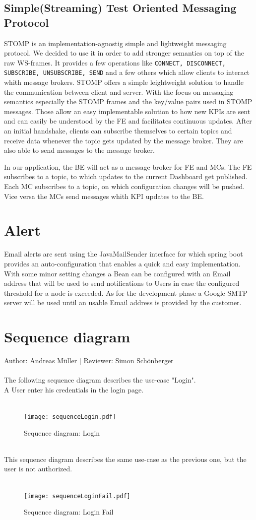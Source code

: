 \documentclass{scrreprt}
\begin{document}
\subsection{Simple(Streaming) Test Oriented Messaging Protocol}
STOMP is an implementation-agnostig simple and lightweight messaging protocol. We decided
to use it in order to add stronger semantics on top of the raw WS-frames. It provides a few
operations like \texttt{CONNECT, DISCONNECT, SUBSCRIBE, UNSUBSCRIBE, SEND} and a few others
which allow clients to interact whith message brokers.
STOMP offers a simple leightweight solution to handle the communication between client and server. With the focus on messaging semantics especially the STOMP frames and the key/value pairs used in STOMP messages. Those allow an easy implementable solution to how new KPIs are sent and can easily be understood by the FE and facilitates continuous updates.
After an initial handshake, clients can subscribe themselves to certain topics and
receive data whenever the topic gets updated by the message broker. They are also able to
send messages to the message broker.

In our application, the BE will act as a message broker for FE and MCs. The FE subscribes to
a topic, to which updates to the current Dashboard get published. Each MC subscribes to
a topic, on which configuration changes will be pushed. Vice versa the MCs send messages
whith KPI updates to the BE.

\section{Alert}
Email alerts are sent using the JavaMailSender interface for which spring boot provides an auto-configuration that enables a quick and easy implementation. With some minor setting changes a Bean can be configured with an Email address that will be used to send notifications to Users in case the configured threshold for a node is exceeded. As for the development phase a Google SMTP server will be used until an usable Email address is provided by the customer.

\section{Sequence diagram}
Author:  Andreas M\"uller |
Reviewer: Simon Sch\"onberger\\ \\
The following sequence diagram describes the use-case "Login". \\
A User enter his credentials in the login page.
\\ \\
\begin{figure}[h]
	\centering
	\texttt{[image: sequenceLogin.pdf]}
	\caption{Sequence diagram: Login}
	\label{alertSequence}
\end{figure}

\pagebreak\
\\
This sequence diagram describes the same use-case as the previous one,
but the user is not authorized.
\\ \\
\begin{figure}[h]
	\centering
	\texttt{[image: sequenceLoginFail.pdf]}
	\caption{Sequence diagram: Login Fail}
	\label{failSequence}
\end{figure}
\end{document}
